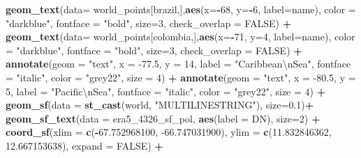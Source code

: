 \documentclass[12pt,oneside]{reedthesis}
\newenvironment{Shaded}{\begin{snugshade}}{\end{snugshade}}
\newcommand{\CharTok}[1]{\textcolor[rgb]{0.31,0.60,0.02}{#1}}
\newcommand{\DataTypeTok}[1]{\textcolor[rgb]{0.13,0.29,0.53}{#1}}
\newcommand{\DecValTok}[1]{\textcolor[rgb]{0.00,0.00,0.81}{#1}}
\newcommand{\FloatTok}[1]{\textcolor[rgb]{0.00,0.00,0.81}{#1}}
\newcommand{\KeywordTok}[1]{\textcolor[rgb]{0.13,0.29,0.53}{\textbf{#1}}}
\newcommand{\NormalTok}[1]{#1}
\newcommand{\OperatorTok}[1]{\textcolor[rgb]{0.81,0.36,0.00}{\textbf{#1}}}
\newcommand{\OtherTok}[1]{\textcolor[rgb]{0.56,0.35,0.01}{#1}}
\newcommand{\StringTok}[1]{\textcolor[rgb]{0.31,0.60,0.02}{#1}}
\begin{document}
\begin{Shaded}
\begin{Highlighting}[]
\StringTok{  }\KeywordTok{geom_text}\NormalTok{(}\DataTypeTok{data=}\NormalTok{ world_points[brazil,],}\KeywordTok{aes}\NormalTok{(}\DataTypeTok{x=}\OperatorTok{-}\DecValTok{68}\NormalTok{, }\DataTypeTok{y=}\OperatorTok{-}\DecValTok{6}\NormalTok{, }\DataTypeTok{label=}\NormalTok{name), }\DataTypeTok{color =} \StringTok{"darkblue"}\NormalTok{, }\DataTypeTok{fontface =} \StringTok{"bold"}\NormalTok{, }\DataTypeTok{size=}\DecValTok{3}\NormalTok{, }\DataTypeTok{check_overlap =} \OtherTok{FALSE}\NormalTok{) }\OperatorTok{+}
\StringTok{  }\KeywordTok{geom_text}\NormalTok{(}\DataTypeTok{data=}\NormalTok{ world_points[colombia,],}\KeywordTok{aes}\NormalTok{(}\DataTypeTok{x=}\OperatorTok{-}\DecValTok{71}\NormalTok{, }\DataTypeTok{y=}\DecValTok{4}\NormalTok{, }\DataTypeTok{label=}\NormalTok{name), }\DataTypeTok{color =} \StringTok{"darkblue"}\NormalTok{, }\DataTypeTok{fontface =} \StringTok{"bold"}\NormalTok{, }\DataTypeTok{size=}\DecValTok{3}\NormalTok{, }\DataTypeTok{check_overlap =} \OtherTok{FALSE}\NormalTok{) }\OperatorTok{+}
\StringTok{  }\KeywordTok{annotate}\NormalTok{(}\DataTypeTok{geom =} \StringTok{"text"}\NormalTok{, }\DataTypeTok{x =} \FloatTok{-77.5}\NormalTok{, }\DataTypeTok{y =} \DecValTok{14}\NormalTok{, }\DataTypeTok{label =} \StringTok{"Caribbean}\CharTok{\textbackslash{}n}\StringTok{Sea"}\NormalTok{, }\DataTypeTok{fontface =} \StringTok{"italic"}\NormalTok{, }\DataTypeTok{color =} \StringTok{"grey22"}\NormalTok{, }\DataTypeTok{size =} \DecValTok{4}\NormalTok{) }\OperatorTok{+}\StringTok{ }
\StringTok{  }\KeywordTok{annotate}\NormalTok{(}\DataTypeTok{geom =} \StringTok{"text"}\NormalTok{, }\DataTypeTok{x =} \FloatTok{-80.5}\NormalTok{, }\DataTypeTok{y =} \DecValTok{5}\NormalTok{, }\DataTypeTok{label =} \StringTok{"Pacific}\CharTok{\textbackslash{}n}\StringTok{Sea"}\NormalTok{, }\DataTypeTok{fontface =} \StringTok{"italic"}\NormalTok{, }\DataTypeTok{color =} \StringTok{"grey22"}\NormalTok{, }\DataTypeTok{size =} \DecValTok{4}\NormalTok{) }\OperatorTok{+}
\StringTok{  }\KeywordTok{geom_sf}\NormalTok{(}\DataTypeTok{data =} \KeywordTok{st_cast}\NormalTok{(world, }\StringTok{"MULTILINESTRING"}\NormalTok{),  }\DataTypeTok{size=}\FloatTok{0.1}\NormalTok{)}\OperatorTok{+}
\StringTok{  }\KeywordTok{geom_sf_text}\NormalTok{(}\DataTypeTok{data =}\NormalTok{ era5_}\DecValTok{4326}\NormalTok{_sf_pol, }\KeywordTok{aes}\NormalTok{(}\DataTypeTok{label =}\NormalTok{ DN), }\DataTypeTok{size=}\DecValTok{2}\NormalTok{) }\OperatorTok{+}
\StringTok{  }\KeywordTok{coord_sf}\NormalTok{(}\DataTypeTok{xlim =} \KeywordTok{c}\NormalTok{(}\OperatorTok{-}\FloatTok{67.752968100}\NormalTok{, }\FloatTok{-66.747031900}\NormalTok{), }\DataTypeTok{ylim =} \KeywordTok{c}\NormalTok{(}\FloatTok{11.832846362}\NormalTok{, }\FloatTok{12.667153638}\NormalTok{), }\DataTypeTok{expand =} \OtherTok{FALSE}\NormalTok{) }\OperatorTok{+}

\end{Highlighting}
\end{Shaded}
\end{document}
